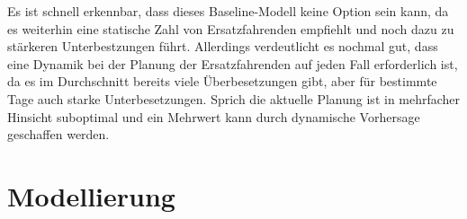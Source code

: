 \documentclass[%
pdftex,
oneside,			%
11pt,				%
parskip=half,		%
headheight = 12pt,	%
headsepline,		%
footsepline,		%
footheight = 16pt,	%
abstracton,		%
DIV=calc,		%
BCOR=8mm,		%
headinclude=false,	%
footinclude=false,	%
listof=totoc,		%
toc=bibliography,	%
]{scrreprt}	%
\begin{document}
        Es ist schnell erkennbar, dass dieses Baseline-Modell keine Option sein kann, da es weiterhin eine statische Zahl von Ersatzfahrenden empfiehlt und noch dazu zu stärkeren Unterbestzungen führt.
        Allerdings verdeutlicht es nochmal gut, dass eine Dynamik bei der Planung der Ersatzfahrenden auf jeden Fall erforderlich ist, da es im Durchschnitt bereits viele Überbesetzungen gibt, aber für bestimmte Tage auch starke Unterbesetzungen.
        Sprich die aktuelle Planung ist in mehrfacher Hinsicht suboptimal und ein Mehrwert kann durch dynamische Vorhersage geschaffen werden.








\chapter{Modellierung}
\end{document}

